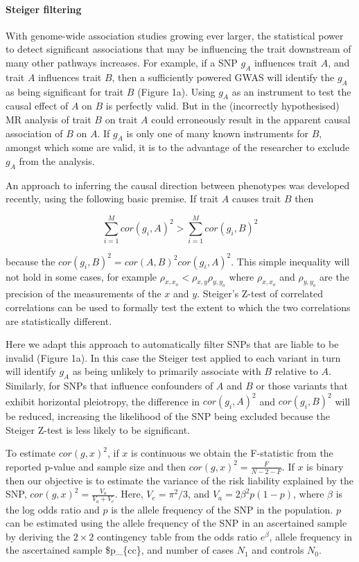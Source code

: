 \documentclass[]{article}
\let\oldparagraph\paragraph
\renewcommand{\paragraph}[1]{\oldparagraph{#1}\mbox{}}
\begin{document}
\paragraph{Steiger filtering}\label{steiger-filtering}

With genome-wide association studies growing ever larger, the
statistical power to detect significant associations that may be
influencing the trait downstream of many other pathways increases. For
example, if a SNP \(g_{A}\) influences trait \(A\), and trait \(A\)
influences trait \(B\), then a sufficiently powered GWAS will identify
the \(g_{A}\) as being significant for trait \(B\) (Figure 1a). Using
\(g_{A}\) as an instrument to test the causal effect of \(A\) on \(B\)
is perfectly valid. But in the (incorrectly hypothesised) MR analysis of
trait \(B\) on trait \(A\) could erroneously result in the apparent
causal association of \(B\) on \(A\). If \(g_{A}\) is only one of many
known instruments for \(B\), amongst which some are valid, it is to the
advantage of the researcher to exclude \(g_{A}\) from the analysis.

An approach to inferring the causal direction between phenotypes was
developed recently, using the following basic premise. If trait \(A\)
causes trait \(B\) then

\[
\sum^M_{i=1}{cor(g_{i}, A)^2} > \sum^M_{i=1}{cor(g_{i}, B)^2}
\]

because the \(cor(g_{i}, B)^2 = cor(A, B)^{2} cor(g_{i}, A)^{2}\). This
simple inequality will not hold in some cases, for example
\(\rho_{x, x_o} < \rho_{x,y}\rho_{y,y_o}\) where \(\rho_{x, x_o}\) and
\(\rho_{y, y_o}\) are the precision of the measurements of the \(x\) and
\(y\). Steiger's Z-test of correlated correlations can be used to
formally test the extent to which the two correlations are statistically
different.

Here we adapt this approach to automatically filter SNPs that are liable
to be invalid (Figure 1a). In this case the Steiger test applied to each
variant in turn will identify \(g_{A}\) as being unlikely to primarily
associate with \(B\) relative to \(A\). Similarly, for SNPs that
influence confounders of \(A\) and \(B\) or those variants that exhibit
horizontal pleiotropy, the difference in \(cor(g_{i}, A)^2\) and
\(cor(g_{i}, B)^2\) will be reduced, increasing the likelihood of the
SNP being excluded because the Steiger Z-test is less likely to be
significant.

To estimate \(cor(g, x)^2\), if \(x\) is continuous we obtain the
F-statistic from the reported p-value and sample size and then
\(cor(g, x)^2 = \frac{F}{N - 2 - F}\). If \(x\) is binary then our
objective is to estimate the variance of the risk liability explained by
the SNP, \(cor(g, x)^2 = \frac{V_a}{V_a + V_e}\). Here,
\(V_e = \pi^2/3\), and \(V_a = 2\beta^2p(1-p)\), where \(\beta\) is the
log odds ratio and \(p\) is the allele frequency of the SNP in the
population. \(p\) can be estimated using the allele frequency of the SNP
in an ascertained sample by deriving the \(2 \times 2\) contingency
table from the odds ratio \(e^\beta\), allele frequency in the
ascertained sample \$p\_\{cc\}, and number of cases \(N_1\) and controls
\(N_0\).
\end{document}
